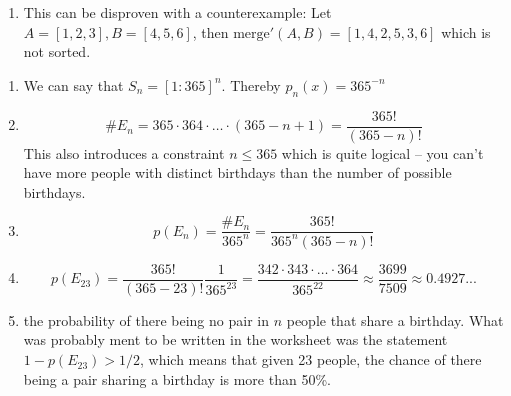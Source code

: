 \documentclass{article}
\begin{document}
\begin{tasks}
{\begin{enumerate}[label={(\arabic*)}]
{                }
                \item {
                    This can be disproven with a counterexample: Let \(A = [1, 2, 3], B = [4, 5, 6]\), then \(\text{merge}'(A, B) = [1, 4, 2, 5, 3, 6]\) which is not sorted.
                }
            \end{enumerate}
        }
        \item {
            \begin{enumerate}[label={(\arabic*)}]
                \item {
                    We can say that \(S_n = [1:365]^n\). Thereby \(p_n(x) = 365^{-n}\)
                }
                \item {
                    \begin{displaymath}
                        \#E_n = 365 \cdot 364 \cdot \ldots \cdot (365-n +1) = \frac{365!}{(365-n)!}
                    \end{displaymath}
                    This also introduces a constraint \(n \leq 365\) which is quite logical -- you can't have more people with distinct birthdays than the number of possible birthdays.
                }
                \item {
                    \begin{displaymath}
                        p(E_n) = \frac{\#E_n}{365^n} = \frac{365!}{365^n(365-n)!}
                    \end{displaymath}
                }
                \item {
                    \begin{displaymath}
                        p(E_{23}) 
                        = \frac{365!}{(365-23)!}\frac{1}{365^{23}}
                        = \frac{342\cdot343\cdot\ldots\cdot364}{365^{22}}
                        \approx \frac{3699}{7509} \approx 0.4927...
                    \end{displaymath}
                }
                \item {{\color{Sepia}{\(p(E_n)\)is}} the probability of there being no pair in \(n\) people that share a birthday. What was probably ment to be written in the worksheet was the statement \(1-p(E_{23})>1/2\), which means that given 23 people, the chance of there being a pair sharing a birthday is more than 50\%.}
            \end{enumerate}
        }
    \end{tasks}
\end{document}
